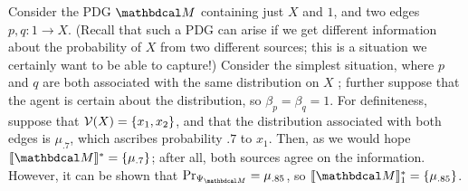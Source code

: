 \documentclass{article}
\begin{document}
	\begin{example}\label{ex:overdet}
	Consider the PDG $\dg M$ containing just $X$ and $1$, and two edges
	$p, q: 1 \to X$.
	(Recall that such a PDG can arise if we get different information about the
	probability of $X$ from two different 
	sources; this is a situation we
	certainly want to be able to capture!)
	Consider the simplest situation, where $p$ and $q$ are both associated
	with the same distribution on $X$%
	; further suppose that the agent is certain about the distribution, so
	$\beta_p = \beta_q = 1$.
	For definiteness, suppose that
	$\mathcal V(X) = \{x_1,x_2\}$, and
	that the distribution associated with both edges is $\mu_{.7}$, which ascribes
	probability $.7$ to $x_1$. Then, as we would hope  $\bbr{\dg M}^* =
	\{\mu_{.7}\}$; after all, both sources agree on the information.
	However, it can be shown that 
	$\Pr_{\WFGof{\dg M}} = \mu_{.85}$, so  $\bbr{\dg M}_1^* = \{\mu_{.85}\}$.
	\end{example}
	
\end{document}
